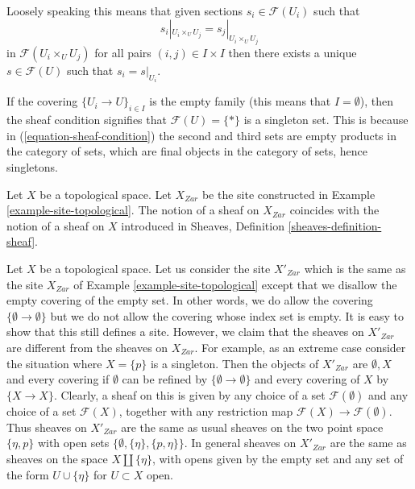 \noindent
Loosely speaking this means that given sections $s_i \in \mathcal{F}(U_i)$
such that
$$
s_i|_{U_i \times_U U_j} = s_j|_{U_i \times_U U_j}
$$
in $\mathcal{F}(U_i \times_U U_j)$ for all pairs $(i, j) \in I \times I$
then there exists a unique $s \in \mathcal{F}(U)$ such
that $s_i = s|_{U_i}$.

\begin{remark}
\label{remark-sheaf-condition-empty-covering}
If the covering $\{U_i \to U\}_{i \in I}$ is the empty family (this means
that $I = \emptyset$), then the sheaf condition signifies that
$\mathcal{F}(U) = \{*\}$ is a singleton set. This is because
in (\ref{equation-sheaf-condition}) the second and third sets
are empty products in the category of sets, which are final objects
in the category of sets, hence singletons.
\end{remark}

\begin{example}
\label{example-sheaves-topological}
Let $X$ be a topological space. Let $X_{Zar}$ be the
site constructed in Example \ref{example-site-topological}.
The notion of a sheaf on $X_{Zar}$ coincides
with the notion of a sheaf on $X$ introduced in
Sheaves, Definition \ref{sheaves-definition-sheaf}.
\end{example}

\begin{example}
\label{example-topological-wrong}
Let $X$ be a topological space. Let us consider the site $X'_{Zar}$ which is
the same as the site $X_{Zar}$ of
Example \ref{example-site-topological} except that
we disallow the empty covering of the empty set.
In other words, we do allow the covering $\{\emptyset \to \emptyset\}$
but we do not allow the covering whose index set is empty.
It is easy to show that this still defines a site. However,
we claim that the sheaves on $X'_{Zar}$ are different
from the sheaves on $X_{Zar}$. For example, as an extreme
case consider the situation where $X = \{p\}$ is a singleton.
Then the objects of $X'_{Zar}$ are $\emptyset, X$
and every covering if $\emptyset$ can be refined by
$\{\emptyset \to \emptyset\}$ and every covering of $X$ by $\{X \to X\}$.
Clearly, a sheaf on this is given by any choice of
a set $\mathcal{F}(\emptyset)$ and any choice of a
set $\mathcal{F}(X)$, together with any restriction map
$\mathcal{F}(X) \to \mathcal{F}(\emptyset)$. Thus sheaves
on $X'_{Zar}$ are the same as usual sheaves on the two point space
$\{\eta, p\}$ with open sets $\{\emptyset, \{\eta\}, \{p, \eta\}\}$.
In general sheaves on $X'_{Zar}$ are the same as sheaves
on the space $X \amalg \{\eta\}$, with opens given by
the empty set and any set of the form $U \cup \{\eta\}$ for
$U \subset X$ open.
\end{example}


